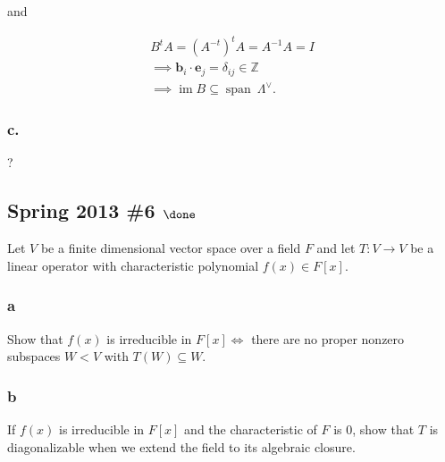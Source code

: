 \begin{solution}
and

\begin{align*}
B^t A = (A^{-t})^t A = A^{-1}A = I \\
\implies \mathbf{b}_i \cdot \mathbf{e}_j = \delta_{ij} \in {\mathbb{Z}}\\
\implies \operatorname{im}B \subseteq {\operatorname{span}}~ \Lambda^\vee
.\end{align*}

\hypertarget{c.}{%
\subsubsection{c.}\label{c.}}

?

\end{solution}

\hypertarget{spring-2013-6-done}{%
\subsection{\texorpdfstring{Spring 2013 \#6
\(\done\)}{Spring 2013 \#6 \textbackslash done}}\label{spring-2013-6-done}}

Let \(V\) be a finite dimensional vector space over a field \(F\) and
let \(T: V\to V\) be a linear operator with characteristic polynomial
\(f(x) \in F[x]\).

\hypertarget{a-105}{%
\subsubsection{a}\label{a-105}}

Show that \(f(x)\) is irreducible in \(F[x] \iff\) there are no proper
nonzero subspaces \(W< V\) with \(T(W) \subseteq W\).

\hypertarget{b-95}{%
\subsubsection{b}\label{b-95}}

If \(f(x)\) is irreducible in \(F[x]\) and the characteristic of \(F\)
is 0, show that \(T\) is diagonalizable when we extend the field to its
algebraic closure.


